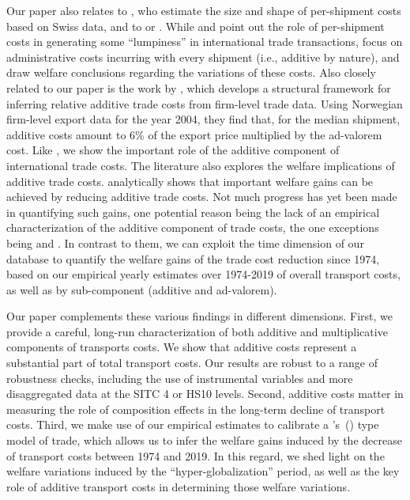 \documentclass[a4paper,11pt]{article}
\newcommand\cites[1]{\citeauthor{#1}'s\ (\citeyear{#1})}
\begin{document}
Our paper also relates to \cite{Kropf-Saure-JIE-2016}, who estimate the size and shape of per-shipment costs based on Swiss data, and to \cite{Alessandria-et-al-AER-2010} or \cite{Hornok-et-al-RES-2015, Hornok-et-al-JIE-2015}. While \cite{Alessandria-et-al-AER-2010}  and \cite{Hornok-et-al-RES-2015} point out the role of per-shipment costs in generating some ``lumpiness'' in international trade transactions, \cite{Hornok-et-al-JIE-2015} focus on administrative costs incurring with every shipment (i.e., additive by nature), and draw welfare conclusions regarding the variations of these costs. Also closely related to our paper is the work by \cite{Irrazabal_2015}, which develops a structural framework for inferring relative additive trade costs from firm-level trade data. Using Norwegian firm-level export data for the year 2004, they find that, for the median shipment, additive costs amount to 6\% of the export price multiplied by the ad-valorem cost. Like \cite{Irrazabal_2015}, we show the important role of the additive component of international trade costs. The literature also explores the welfare implications of additive trade costs. \cite{sorensen2014} analytically shows that important welfare gains can be achieved by reducing additive trade costs. Not much progress has yet been made in quantifying such gains, one potential reason being the lack of an empirical characterization of the additive component of trade costs, the one exceptions being \cite{Irrazabal_2015} and \cite{Hornok-et-al-JIE-2015}. In contrast to them, we can exploit the time dimension of our database to quantify the welfare gains of the trade cost reduction since 1974, based on our empirical yearly estimates over 1974-2019 of overall transport costs, as well as by sub-component (additive and ad-valorem).\smallskip

Our paper complements these various findings in different dimensions. First, we provide a careful, long-run characterization of both additive and multiplicative components of transports costs. We show that additive costs represent a substantial part of total transport costs. Our results are robust to a range of robustness checks, including the use of instrumental variables and more disaggregated data at the SITC 4 or HS10 levels. Second, additive costs matter in measuring the role of composition effects in the long-term decline of transport costs. Third, we make use of our empirical estimates to calibrate a \cites{melitz} type model of trade, which allows us to infer the welfare gains induced by the decrease of transport costs between 1974 and 2019. In this regard, we shed light on the welfare variations induced by the ``hyper-globalization'' period, as well as the key role of additive transport costs in determining those welfare variations. \smallskip
\end{document}
